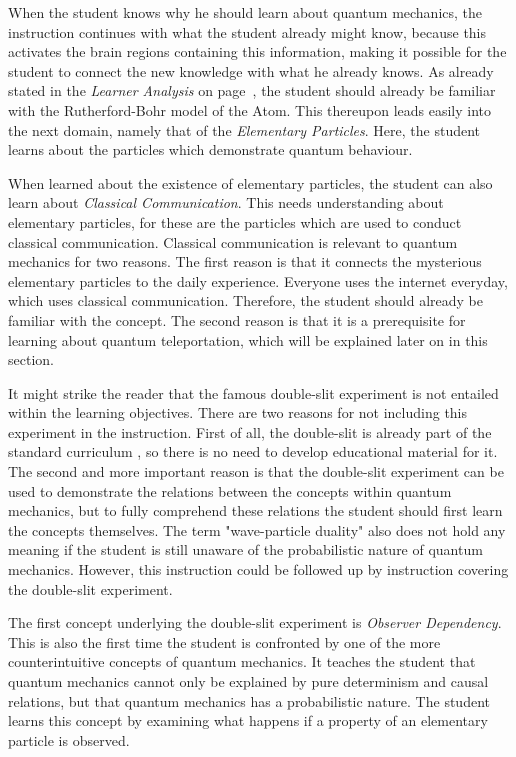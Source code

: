 \documentclass[11pt,twoside]{report} %
\begin{document}
When the student knows why he should learn about quantum mechanics, the instruction continues with what the student already might know, because this activates the brain regions containing this information, making it possible for the student to connect the new knowledge with what he already knows. As already stated in the \emph{Learner Analysis} on page~\pageref{sec:learneranalysis}, the student should already be familiar with the Rutherford-Bohr model of the Atom. This thereupon leads easily into the next domain, namely that of the \emph{Elementary Particles}. Here, the student learns about the particles which demonstrate quantum behaviour.

When learned about the existence of elementary particles, the student can also learn about \emph{Classical Communication}. This needs understanding about elementary particles, for these are the particles which are used to conduct classical communication. Classical communication is relevant to quantum mechanics for two reasons. The first reason is that it connects the mysterious elementary particles to the daily experience. Everyone uses the internet everyday, which uses classical communication. Therefore, the student should already be familiar with the concept. The second reason is that it is a prerequisite for learning about quantum teleportation, which will be explained later on in this section.

It might strike the reader that the famous double-slit experiment is not entailed within the learning objectives. There are two reasons for not including this experiment in the instruction. First of all, the double-slit is already part of the standard curriculum \cite{eindexamen2015}, so there is no need to develop educational material for it. The second and more important reason is that the double-slit experiment can be used to demonstrate the relations between the concepts within quantum mechanics, but to fully comprehend these relations the student should first learn the concepts themselves. The term "wave-particle duality" also does not hold any meaning if the student is still unaware of the probabilistic nature of quantum mechanics. However, this instruction could be followed up by instruction covering the double-slit experiment.

The first concept underlying the double-slit experiment is \emph{Observer Dependency}. This is also the first time the student is confronted by one of the more counterintuitive concepts of quantum mechanics. It teaches the student that quantum mechanics cannot only be explained by pure determinism and causal relations, but that quantum mechanics has a probabilistic nature. The student learns this concept by examining what happens if a property of an elementary particle is observed.
\end{document}
